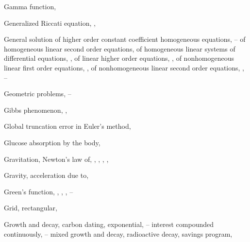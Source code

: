 \begin{theindex}
  \item Gamma function, \pageref{exer:8.1.16}

  \item Generalized Riccati equation, \pageref{exer:2.4.55}, \pageref{exer:5.6.40}

  \item General solution
    \subitem of higher order constant coefficient homogeneous equations, \pageref{eq:9.2.1}--\pageref{thmtype:9.2.1}
    \subitem of homogeneous linear second order equations, \pageref{thmtype:5.1.2}
    \subitem of homogeneous linear systems of differential equations, \pageref{eq:10.3.1}, \pageref{thmtype:10.3.3}
    \subitem of linear higher order equations, \pageref{eq:9.1.3}, \pageref{thmtype:9.1.5}
    \subitem of nonhomogeneous linear first order equations, \pageref{eq:2.1.2}, \pageref{thmtype:2.1.2}
    \subitem of nonhomogeneous linear second order equations, \pageref{eq:5.3.5}, \pageref{eq:5.6.1}--\pageref{exer:5.6.40}

  \item Geometric problems, \pageref{example:5.4.7}--\pageref{example:4.5.8}

  \item Gibbs phenomenon, \pageref{example:11.2.1}, \pageref{example:11.2.7}

  \item Global truncation error in Euler's method, \pageref{eq:3.1.18}

  \item Glucose absorption by the body, \pageref{eq:1.1.7}

  \item Gravitation, Newton's law of, \pageref{eq:4.3.1}, \pageref{exer:4.4.17}, \pageref{exer:6.3.17}, \pageref{example:10.1.3}, \pageref{exer:10.1.4}

  \item Gravity, acceleration due to,\pageref{eq:4.3.1}

  \item Green's function, \pageref{exer:9.4.34}, \pageref{eq:13.1.17}, \pageref{example:13.1.6}, \pageref{exer:13.1.21}--\pageref{exer:13.1.25}

  \item Grid, rectangular, \pageref{figure:1.3.1}

  \item Growth and decay,
    \subitem carbon dating, \pageref{example:4.1.5}
    \subitem exponential, \pageref{eq:4.1.1}--\pageref{exer:4.1.27}
    \subitem interest compounded continuously, \pageref{eq:4.1.8}--\pageref{example:4.1.3}
    \subitem mixed growth and decay, \pageref{example:4.1.4}
    \subitem radioactive decay, \pageref{eq:4.1.3}
    \subitem savings program, \pageref{example:4.1.6} 


\end{theindex}

